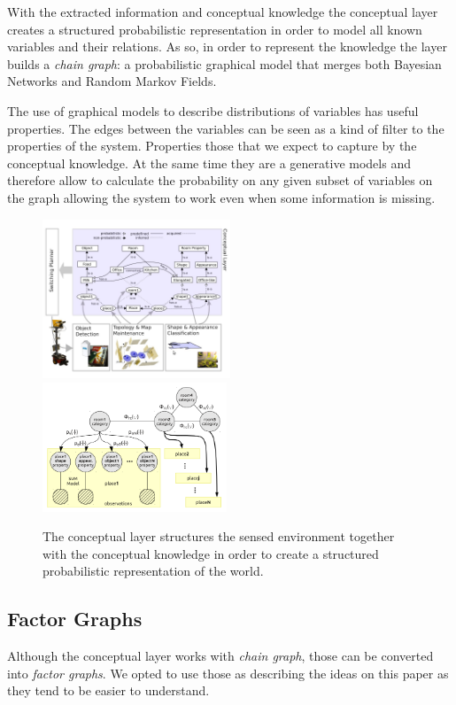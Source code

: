 \documentclass[runningheads,a4paper]{llncs}
\begin{document}
With the extracted information and conceptual knowledge the conceptual layer creates a structured probabilistic representation
in order to model all known variables and their relations.
As so, in order to represent the knowledge the layer builds a \emph{chain graph}:
a probabilistic graphical model that merges both Bayesian Networks and Random Markov Fields.

The use of graphical models to describe distributions of variables has useful properties.
The edges between the variables can be seen as a kind of filter to the properties of the system.
Properties those that we expect to capture by the conceptual knowledge.
At the same time they are a generative models and therefore allow to calculate the probability
on any given subset of variables on the graph allowing the system to work even when some information is missing.


\begin{figure}[h]
\centering

\includegraphics[width=0.50\textwidth]{figures/conceptual-layer.jpg}
\includegraphics[width=0.49\textwidth]{figures/chain-graph.png}
\caption{The conceptual layer structures the sensed environment together with the conceptual knowledge in order to
         create a structured probabilistic representation of the world.}
\end{figure}

\subsection{Factor Graphs}
Although the conceptual layer works with \emph{chain graph}, those can be converted into \emph{factor graphs}.
We opted to use those as describing the ideas on this paper as they tend to be easier to understand.
\end{document}
